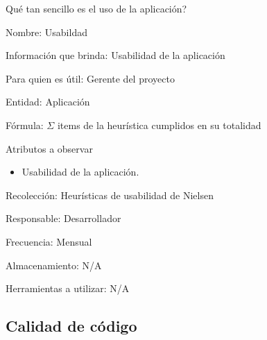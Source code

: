  {
    \pregunta Qué tan sencillo es el uso de la aplicación?
} {
     {
        \item Nombre: Usabildad
        \item Información que brinda: Usabilidad de la aplicación
        \item Para quien es útil: Gerente del proyecto
        \item Entidad: Aplicación
        \item Fórmula: $\Sigma$ items de la heurística cumplidos en su totalidad
        \item Atributos a observar
            \begin{itemize}
                \item Usabilidad de la aplicación.
            \end{itemize}
        \item Recolección: Heurísticas de usabilidad de Nielsen
        \item Responsable: Desarrollador
        \item Frecuencia: Mensual
        \item Almacenamiento: N/A
        \item Herramientas a utilizar: N/A
    }
}

\subsection{Calidad de código}

